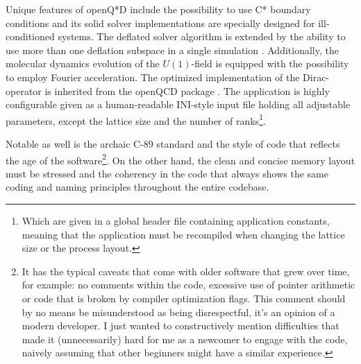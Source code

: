 \documentclass{article}
\theoremstyle{plain} %
\theoremstyle{convention} %
\theoremstyle{remark} %
\numberwithin{equation}{section}
\begin{document}
Unique features of openQ*D include the possibility to use C* boundary conditions and its solid solver implementations are specially designed for ill-conditioned systems. The deflated solver algorithm is extended by the ability to use more than one deflation subspace in a single simulation \cite{openqxd}. Additionally, the molecular dynamics evolution of the $U(1)$-field is equipped with the possibility to employ Fourier acceleration. The optimized implementation of the Dirac-operator is inherited from the openQCD package \cite{openqcd}. The application is highly configurable given as a human-readable INI-style input file holding all adjustable parameters, except the lattice size and the number of ranks\footnote{Which are given in a global header file containing application constants, meaning that the application must be recompiled when changing the lattice size or the process layout.}.

Notable as well is the archaic C-89 standard and the style of code that reflects the age of the software\footnote{It has the typical caveats that come with older software that grew over time, for example: no comments within the code, excessive use of pointer arithmetic or code that is broken by compiler optimization flags. This comment should by no means be misunderstood as being disrespectful, it's an opinion of a modern developer. I just wanted to constructively mention difficulties that made it (unnecessarily) hard for me as a newcomer to engage with the code, naively assuming that other beginners might have a similar experience.


}. On the other hand, the clean and concise memory layout must be stressed and the coherency in the code that always shows the same coding and naming principles throughout the entire codebase.

\end{document}
